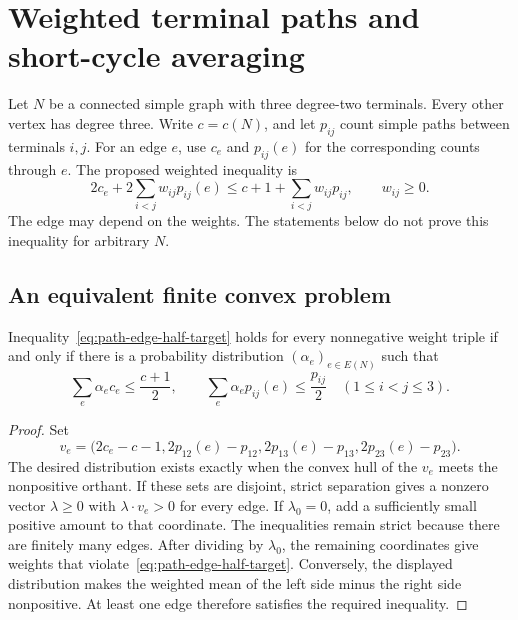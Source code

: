 \section{Weighted terminal paths and short-cycle averaging}
\label{sec:path-edge-half-weighted}

Let $N$ be a connected simple graph with three degree-two terminals.
Every other vertex has degree three.
Write $c=c(N)$, and let $p_{ij}$ count simple paths between terminals $i,j$.
For an edge $e$, use $c_e$ and $p_{ij}(e)$ for the corresponding counts through $e$.
The proposed weighted inequality is
\begin{equation}\label{eq:path-edge-half-target}
 2c_e+2\sum_{i<j}w_{ij}p_{ij}(e)
 \le c+1+\sum_{i<j}w_{ij}p_{ij},\qquad w_{ij}\ge0.
\end{equation}
The edge may depend on the weights.
The statements below do not prove this inequality for arbitrary $N$.

\subsection{An equivalent finite convex problem}

\begin{lemma}\label{lem:path-edge-half-dual}
Inequality~\eqref{eq:path-edge-half-target} holds for every nonnegative weight triple if and only if there is a probability distribution $(\alpha_e)_{e\in E(N)}$ such that
\[
 \sum_e\alpha_ec_e\le\frac{c+1}{2},\qquad
 \sum_e\alpha_ep_{ij}(e)\le\frac{p_{ij}}2
 \quad(1\le i<j\le3).
\]
\end{lemma}

\begin{proof}
Set
\[
 v_e=\bigl(2c_e-c-1,
 2p_{12}(e)-p_{12},2p_{13}(e)-p_{13},2p_{23}(e)-p_{23}\bigr).
\]
The desired distribution exists exactly when the convex hull of the $v_e$ meets the nonpositive orthant.
If these sets are disjoint, strict separation gives a nonzero vector $\lambda\ge0$ with $\lambda\cdot v_e>0$ for every edge.
If $\lambda_0=0$, add a sufficiently small positive amount to that coordinate.
The inequalities remain strict because there are finitely many edges.
After dividing by $\lambda_0$, the remaining coordinates give weights that violate~\eqref{eq:path-edge-half-target}.
Conversely, the displayed distribution makes the weighted mean of the left side minus the right side nonpositive.
At least one edge therefore satisfies the required inequality.
\end{proof}

